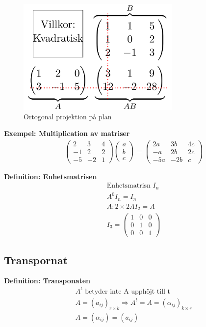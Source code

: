 \begin{multicols}{2}
\begin{figure}[H]
    \centering
    \includegraphics[width=8cm]{image/matris-multiplikation.png} 
    \caption{Ortogonal projektion på plan}
\end{figure}

\textbf{Exempel: Multiplication av matriser}
\begin{align*}
  &\quad
  \left(\begin{array}{ccc}
    2  & 3  & 4 \\
    -1 & 2  & 2 \\
    -5 & -2 & 1 
  \end{array}\right)
  \left(\begin{array}{c}
    a \\
    b \\
    c 
  \end{array}\right) =
  \left(\begin{array}{ccc}
    2a  & 3b  & 4c \\
    -a & 2b  & 2c \\
    -5a & -2b & c 
  \end{array}\right)
\end{align*}

\textbf{Definition: Enhetsmatrisen}
\begin{align*}
  &\quad  \text{Enhetsmatrisn } I_n \\
  &\quad  A^0I_n = I_n \\
  &\quad  A: 2\times{2} AI_2 = A \\
  &\quad  I_3 =
  \left(\begin{array}{ccc}
    1 & 0 & 0 \\
    0 & 1 & 0 \\
    0 & 0 & 1 
  \end{array}\right)
\end{align*}


\subsection{Transpornat}
\textbf{Definition: Transponaten}
\begin{align*}
  &\quad  A^t \text{ betyder inte A upphöjt till t} \\
  &\quad  A={(a_{ij})}_{r\times{k}} \Rightarrow A^t=A={(\alpha_{ij})}_{k\times{r}} \\
  &\quad  A={(\alpha_{ij})}={(a_{ij})}  \\
\end{align*}


\end{multicols}

